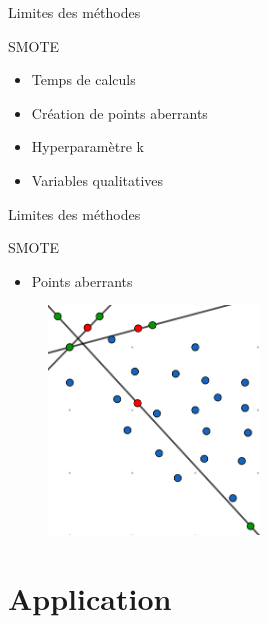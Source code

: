 \documentclass{beamer}
\begin{document}
\begin{frame}{Limites des méthodes}
\begin{block}{SMOTE}
    \begin{itemize}
    \item Temps de calculs
     \item Création de points aberrants
     \item Hyperparamètre k
     \item Variables qualitatives
     \end{itemize}
\end{block}

\end{frame}

\begin{frame}{Limites des méthodes}
\begin{block}{SMOTE}
    \begin{itemize}
       \item Points aberrants
   \end{itemize}
\end{block}

    \begin{figure}
    \centering
    \includegraphics[width=0.5\textwidth]{images/lsmote.png}

\end{figure}
\end{frame}



\section{Application}
\end{document}
